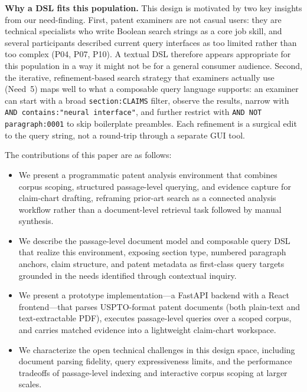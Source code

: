 \documentclass[sigconf]{acmart}
\begin{document}
\smallskip\noindent\textbf{Why a DSL fits this population.}
This design is motivated by two key insights from our need-finding. First,
patent examiners are not casual users: they are technical specialists who
write Boolean search strings as a core job skill, and several participants
described current query interfaces as too limited rather than too complex
(P04, P07, P10). A textual DSL therefore appears appropriate for this population
in a way it might not be for a general consumer audience. Second, the
iterative, refinement-based search strategy that examiners actually use (Need~5)
maps well to what a composable query language supports: an examiner can start
with a broad \texttt{section:CLAIMS} filter, observe the results, narrow with
\texttt{AND contains:"neural interface"}, and further restrict with
\texttt{AND NOT paragraph:0001} to skip boilerplate preambles. Each refinement
is a surgical edit to the query string, not a round-trip through a separate
GUI tool.

The contributions of this paper are as follows:
\begin{itemize}
  \item We present a programmatic patent analysis environment that combines
    corpus scoping, structured passage-level querying, and evidence capture
    for claim-chart drafting, reframing prior-art search as a connected
    analysis workflow rather than a document-level retrieval task followed by
    manual synthesis.
  \item We describe the passage-level document model and composable query DSL
    that realize this environment, exposing section type, numbered paragraph
    anchors, claim structure, and patent metadata as first-class query targets
    grounded in the needs identified through contextual inquiry.
  \item We present a prototype implementation---a FastAPI backend with a
    React frontend---that parses USPTO-format patent documents (both
    plain-text and text-extractable PDF), executes passage-level queries over
    a scoped corpus, and carries matched evidence into a lightweight
    claim-chart workspace.
  \item We characterize the open technical challenges in this design space,
    including document parsing fidelity, query expressiveness limits, and the
    performance tradeoffs of passage-level indexing and interactive corpus
    scoping at larger scales.
\end{itemize}


\end{document}
